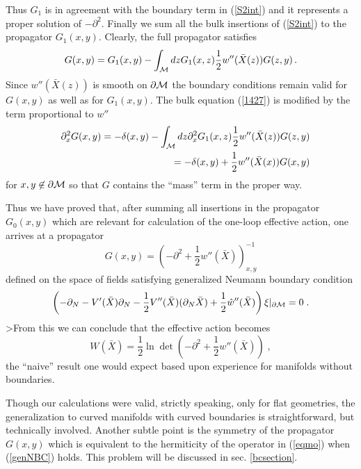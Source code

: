 \documentclass[a4paper,12pt]{article}
\begin{document}
Thus $G_1$ is in agreement with the boundary term in 
(\ref{S2int}) and it represents a proper solution of $- 
\partial^2$. Finally 
 we sum  all the bulk insertions of (\ref{S2int}) to the propagator
$G_1(x,y)$. Clearly, the full propagator satisfies
\begin{equation}
G(x,y)=G_1(x,y)-\int_{\cal M} dz G_1(x,z)\frac 12 w''(\bar X(z))
G(z,y) \, .
\label{G1G}
\end{equation}
Since $w''(\bar X(z))$ is smooth on $\partial {\cal M}$ 
 the boundary
conditions remain valid for $G(x,y)$ as well as for $G_1(x,y)$.
The bulk equation (\ref{1427}) is modified by the term 
proportional to $w''$ 
\begin{eqnarray}
&&\partial^2_x G(x,y)=-\delta (x,y)-\int_{\cal M} dz \partial_x^2 G_1(x,z)
\frac 12 w''(\bar X(z)) G(z,y) \nonumber \\
&&\qquad\qquad\ =-\delta (x,y) +\frac 12  w''(\bar X(x)) G(x,y)
\label{eqmo}
\end{eqnarray}
for $x,y\not\in {\partial{\cal M}}$ so that $G$ contains the 
``mass'' term in the proper way. 

Thus we have proved that,  after summing  all insertions in the
propagator $G_0(x,y)$ which are relevant for calculation of the
one-loop effective action,  one arrives at  a propagator 
\begin{equation}
G(x,y)=\left( -\partial^2 +\frac 12 w''(\bar X)\right)^{-1}_{x,y} 
\label{fullprop}
\end{equation}
defined on the space of fields satisfying  generalized
Neumann boundary condition
\begin{equation}
\left( -\partial_N -V'(\bar X)\partial_N  -\frac 12 V''(\bar X)
(\partial_N\bar X)
+\frac 12 \hat w''(\bar X) \right) \xi |_{\partial {\cal 
M}}=0\; .
\label{genNBC}
\end{equation}
>From this we can conclude that the effective 
action becomes 
\begin{equation}
W(\bar X)=\frac 12 \ln \det 
\left( -\partial^2 +\frac 12 w''(\bar X)\right) \; ,
\label{ea1504}
\end{equation}
the ``naive'' result one would expect based upon  experience
for manifolds without boundaries. 

Though our calculations were valid, strictly speaking, only for
flat geometries, the generalization to curved manifolds with curved
boundaries is straightforward,  but technically involved. Another
subtle point is the symmetry of the propagator $G(x,y)$ which is
equivalent to the hermiticity of the operator in (\ref{eqmo})
when (\ref{genNBC}) holds. This problem will be discussed in
sec. \ref{bcsection}.
\end{document}
